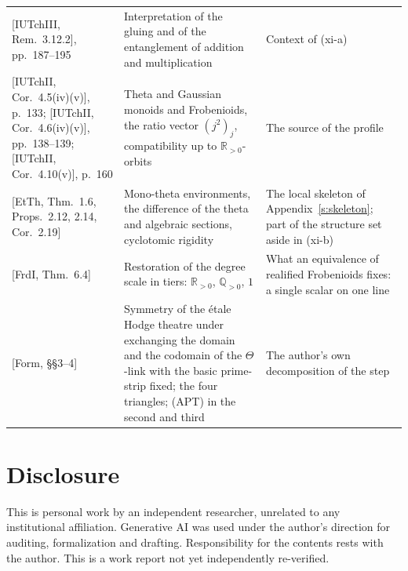 \documentclass[11pt]{article}
\theoremstyle{definition}
\begin{document}
{\begin{longtable}{@{}>{\raggedright\arraybackslash}p{}>{\raggedright\arraybackslash}p{}>{\raggedright\arraybackslash}p{}@{}}
{}[IUTchIII, Rem.~3.12.2], pp.~187--195 & Interpretation of the gluing and of the entanglement of addition and multiplication & Context of (xi-a)\\\addlinespace[3pt]
{}[IUTchII, Cor.~4.5(iv)(v)], p.~133; [IUTchII, Cor.~4.6(iv)(v)], pp.~138--139; [IUTchII, Cor.~4.10(v)], p.~160 & Theta and Gaussian monoids and Frobenioids, the ratio vector $(j^2)_j$, compatibility up to $\mathbb R_{>0}$-orbits & The source of the profile\\\addlinespace[3pt]
{}[EtTh, Thm.~1.6, Props.~2.12, 2.14, Cor.~2.19] & Mono-theta environments, the difference of the theta and algebraic sections, cyclotomic rigidity & The local skeleton of Appendix~\ref{s:skeleton}; part of the structure set aside in (xi-b)\\\addlinespace[3pt]
{}[FrdI, Thm.~6.4] & Restoration of the degree scale in tiers: $\mathbb R_{>0}$, $\mathbb Q_{>0}$, $1$ & What an equivalence of realified Frobenioids fixes: a single scalar on one line\\\addlinespace[3pt]
{}[Form, \S\S3--4] & Symmetry of the \'etale Hodge theatre under exchanging the domain and the codomain of the $\Theta$-link with the basic prime-strip fixed; the four triangles; (APT) in the second and third & The author's own decomposition of the step\\
\bottomrule
\end{longtable}}

\section*{Disclosure}

This is personal work by an independent researcher, unrelated to
any institutional affiliation.  Generative AI was used under the
author's direction for auditing, formalization and drafting.
Responsibility for the contents rests with the author.  This is
a work report not yet independently re-verified.
\end{document}
